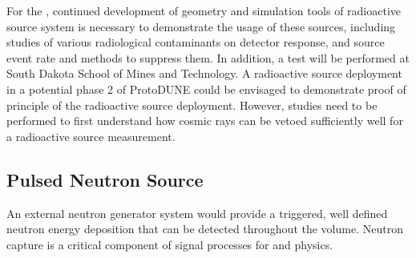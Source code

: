 For the , continued development of geometry and simulation tools of radioactive source system is necessary to demonstrate the usage of these sources, including studies of various radiological contaminants on detector response, and source event rate and methods to suppress them. In addition, a test will be performed at South Dakota School of Mines and Technology. A radioactive source deployment in a potential phase 2 of ProtoDUNE could be envisaged to demonstrate proof of principle of the radioactive source deployment. However, studies need to be performed to first understand how cosmic rays can be vetoed sufficiently well for a radioactive source measurement.

\subsection{Pulsed Neutron Source}  %
\label{sec:neutron}

An external neutron generator system would provide a triggered, well defined neutron energy deposition that can be detected throughout the volume. Neutron capture is a critical component of signal processes for  and  physics. 

